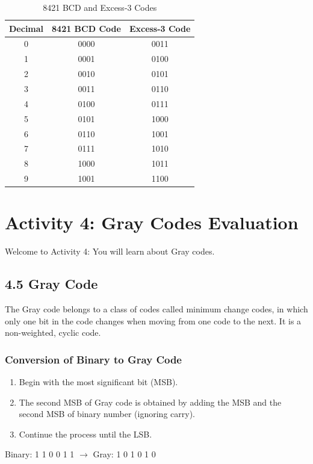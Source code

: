 \documentclass[12pt,a4paper]{article}
\begin{document}
\begin{table}[h!]
    \centering
    \caption{8421 BCD and Excess-3 Codes}
    \begin{tabular}{|c|c|c|}
        \hline
        \textbf{Decimal} & \textbf{8421 BCD Code} & \textbf{Excess-3 Code} \\ \hline
        0 & 0000 & 0011 \\ \hline
        1 & 0001 & 0100 \\ \hline
        2 & 0010 & 0101 \\ \hline
        3 & 0011 & 0110 \\ \hline
        4 & 0100 & 0111 \\ \hline
        5 & 0101 & 1000 \\ \hline
        6 & 0110 & 1001 \\ \hline
        7 & 0111 & 1010 \\ \hline
        8 & 1000 & 1011 \\ \hline
        9 & 1001 & 1100 \\ \hline
    \end{tabular}
\end{table}

\section*{Activity 4: Gray Codes Evaluation}
Welcome to Activity 4: You will learn about Gray codes.

\subsection*{4.5 Gray Code}
The Gray code belongs to a class of codes called minimum change codes, in which only one bit in the code changes when moving from one code to the next. It is a non-weighted, cyclic code.

\subsubsection*{Conversion of Binary to Gray Code}
\begin{enumerate}
    \item Begin with the most significant bit (MSB).
    \item The second MSB of Gray code is obtained by adding the MSB and the second MSB of binary number (ignoring carry).
    \item Continue the process until the LSB.
\end{enumerate}
\begin{example}
    Binary: 1 1 0 0 1 1 $\rightarrow$ Gray: 1 0 1 0 1 0
\end{example}
\end{document}
